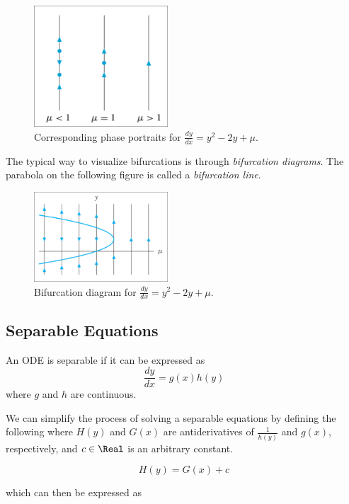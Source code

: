 \begin{figure}[H]
    \centering
    \includegraphics[width=50mm]{content/diffeq/images/bifurcation_1.png}
    \caption{Corresponding phase portraits for $\frac{dy}{dx} = y^2 - 2y + \mu$.}
\end{figure}

The typical way to visualize bifurcations is through \textit{bifurcation diagrams}. The parabola on the following figure is called a \textit{bifurcation line}.

\begin{figure}[H]
    \centering
    \includegraphics[width=50mm]{content/diffeq/images/bifurcation_2.png}
    \caption{Bifurcation diagram for $\frac{dy}{dx} = y^2 - 2y + \mu$.}
\end{figure}

\subsection{Separable Equations}

\begin{definition}
    An ODE is separable if it can be expressed as 
    \[
        \frac{dy}{dx} = g(x)h(y)
    \]
    where $g$ and $h$ are continuous.
\end{definition}

We can simplify the process of solving a separable equations by defining the following where $H(y)$ and $G(x)$ are antiderivatives of $\frac{1}{h(y)}$ and $g(x)$, respectively, and $c \in \Real$ is an arbitrary constant.

\[
    H(y) = G(x) + c
\]

which can then be expressed as

